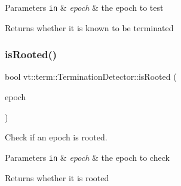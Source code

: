 \begin{DoxyParams}[1]{Parameters}
\mbox{\tt in}  & {\em epoch} & the epoch to test\\
\hline
\end{DoxyParams}
\begin{DoxyReturn}{Returns}
whether it is known to be terminated 
\end{DoxyReturn}
\mbox{\label{structvt_1_1term_1_1_termination_detector_ad95b226357b77e29c415627bbca4e798}} 
\subsubsection{\texorpdfstring{is\+Rooted()}{isRooted()}}
{\footnotesize\ttfamily bool vt\+::term\+::\+Termination\+Detector\+::is\+Rooted (\begin{DoxyParamCaption}\item[{\hyperlink{namespacevt_a81d11b28122d43bf9834577e4a06440f}{Epoch\+Type}}]{epoch }\end{DoxyParamCaption})\hspace{0.3cm}{\ttfamily [inline]}}



Check if an epoch is rooted. 


\begin{DoxyParams}[1]{Parameters}
\mbox{\tt in}  & {\em epoch} & the epoch to check\\
\hline
\end{DoxyParams}
\begin{DoxyReturn}{Returns}
whether it is rooted 
\end{DoxyReturn}
\mbox{\label{structvt_1_1term_1_1_termination_detector_a48d9022d6bb4ff56e42ebefebe1a0586}} 

